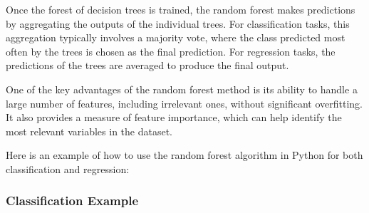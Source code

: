 \documentclass{article}
\begin{document}
Once the forest of decision trees is trained, the random forest makes
predictions by aggregating the outputs of the individual trees. For
classification tasks, this aggregation typically involves a majority
vote, where the class predicted most often by the trees is chosen as the
final prediction. For regression tasks, the predictions of the trees are
averaged to produce the final output.

One of the key advantages of the random forest method is its ability to
handle a large number of features, including irrelevant ones, without
significant overfitting. It also provides a measure of feature
importance, which can help identify the most relevant variables in the
dataset.

Here is an example of how to use the random forest algorithm in Python
for both classification and regression:

    \subsubsection{Classification Example}\label{classification-example}
\end{document}
